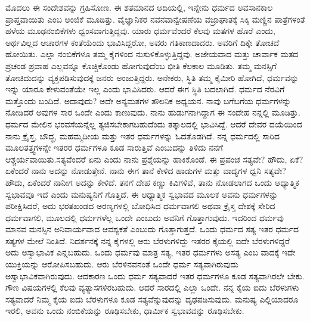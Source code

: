 ಮೊದಲು ಈ ಸಂದೇಶವನ್ನು ಗ್ರಹಿಸೋಣ. ಈ ಶತಮಾನದ ಆದಿಯಲ್ಲಿ, ಇನ್ನೇನು ಧರ್ಮದ ಅವಸಾನಕಾಲ ಪ್ರಾಪ್ತವಾಯಿತು ಎಂಬ ಅಂಜಿಕೆ ಮೂಡಿತ್ತು. ವೈಜ್ಞಾನಿಕರ ನವನವಾನ್ವೇಷಣೆಯ ವಜ್ರಾಘಾತಕ್ಕೆ ಸಿಕ್ಕಿ ಮಣ್ಣಿನ ಪಾತ್ರೆಗಳಂತೆ ಹಳೆಯ ಮೂಢನಂಬಿಕೆಗಳು ಧ್ವಂಸವಾಗುತ್ತಿದ್ದವು. ಯಾರು ಧರ್ಮವೆಂದರೆ ಕೆಲವು ಮತಗಳ ಹೊರೆ ಎಂದು, ಅರ್ಥವಿಲ್ಲದ ಆಚಾರಗಳ ಕಂತೆಯೆಂದು ಭಾವಿಸಿದ್ದರೋ, ಅವರು ಗತಿಕಾಣದಾದರು. ಅವರಿಗೆ ದಿಕ್ಕೇ ತೋಚದೆ ಹೋಯಿತು. ಎಲ್ಲಾ ನಂಬಿಕೆಗಳೂ ತಮ್ಮ ಕೈಗಳಿಂದ ನುಸುಳಿಕೊಳ್ಳುತ್ತಿದ್ದವು. ಅಜೇಯವಾದ ಮತ್ತು ಚಾರ್ವಾಕ ಮತದ ಪ್ರಚಂಡ ಪ್ರವಾಹ ಎಲ್ಲವನ್ನೂ ಕೊಚ್ಚಿಕೊಂಡು ಹೋಗುವುದೆಂಬ ಭೀತಿ ಕೆಲಕಾಲ ಮೂಡಿತು. ತಮ್ಮ ಮನಸ್ಸಿಗೆ ತೋಚಿದುದನ್ನು ವ್ಯಕ್ತಪಡಿಸುವುದಕ್ಕೆ ಜನರು ಅಂಜುತ್ತಿದ್ದರು. ಅನೇಕರು, ಸ್ಥಿತಿ ತಮ್ಮ ಕೈಮೀರಿ ಹೋಗಿದೆ, ಧರ್ಮವನ್ನು ಇನ್ನು ಯಾರೂ ಕೇಳುವಂತೆಯೇ ಇಲ್ಲ ಎಂದು ಭಾವಿಸಿದರು. ಆದರೆ ಈಗ ಸ್ಥಿತಿ ಬದಲಾಗಿದೆ. ಧರ್ಮದ ನೆರವಿಗೆ ಮತ್ತೊಂದು ಬಂದಿದೆ. ಅದಾವುದು? ಅದೇ ಅನ್ಯಮತಗಳ ತೌಲನಿಕ ಅಧ್ಯಯನ. ನಾವು ಬಗೆಬಗೆಯ ಧರ್ಮಗಳನ್ನು ನೋಡಿದರೆ ಅವುಗಳ ಸಾರ ಒಂದೇ ಎಂದು ಕಾಣುವುದು. ನಾನು ಹುಡುಗನಾಗಿದ್ದಾಗ ಈ ಸಂದೇಹ ನನ್ನಲ್ಲಿ ಮೂಡಿತ್ತು. ಧರ್ಮದ ಮೇಲಿನ ಭರವಸೆಯನ್ನೆಲ್ಲ ತ್ಯಜಿಸಬೇಕಾಗಬಹುದೆಂದು ತತ್ಕಾಲದಲ್ಲಿ ಭಾವಿಸಿದ್ದೆ. ಆದರೆ ದೇವರ ದಯೆಯಿಂದ ನಾನು ಕ್ರೈಸ್ತ, ಬೌದ್ಧ, ಮಹಮ್ಮದೀಯ ಮತ್ತು ಇತರ ಧರ್ಮಗಳನ್ನು ಓದತೊಡಗಿದೆ. ನನ್ನ ಧರ್ಮದಲ್ಲಿ ಸಾರಿದ ಮೂಲತತ್ತ್ವಗಳನ್ನೇ ಇತರರ ಧರ್ಮಗಳೂ ಕೂಡ ಸಾರುತ್ತಿವೆ ಎಂಬುದನ್ನು ತಿಳಿದು ನನಗೆ ಆಶ್ಚರ್ಯವಾಯಿತು.\break ಸತ್ಯವೆಂದರೆ ಏನು ಎಂದು ನಾನು ಪ್ರಶ್ನೆಯನ್ನು ಹಾಕಿಕೊಂಡೆ. ಈ ಪ್ರಪಂಚ ಸತ್ಯವೇ? ಹೌದು, ಏಕೆ? ಏಕೆಂದರೆ ನಾನು ಅದನ್ನು ನೋಡುತ್ತೇನೆ. ನಾನು ಈಗ ತಾನೆ ಕೇಳಿದ ಹಾಡುಗಳ ಮತ್ತು ವಾದ್ಯಗಳ ಧ್ವನಿ ಸತ್ಯವೇ? ಹೌದು, ಏಕೆಂದರೆ ನಾನೀಗ ಅದನ್ನು ಕೇಳಿದೆ. ತನಗೆ ದೇಹ ಕಣ್ಣು ಕಿವಿಗಳಿವೆ, ತಾನು ನೋಡಲಾಗದ ಒಂದು ಆಧ್ಯಾತ್ಮಿಕ ಸ್ವಭಾವವೂ ಇದೆ ಎಂದು ಮನುಷ್ಯನಿಗೆ ಗೊತ್ತಿದೆ. ಈ ಆಧ್ಯಾತ್ಮಿಕ ಸ್ವಭಾವದ ಮೂಲಕ ಅವನು ಧರ್ಮಗಳನ್ನು ಪರೀಕ್ಷಿಸಿದರೆ, ಅದು ಭರತಖಂಡದ ಅರಣ್ಯಗಳಲ್ಲಿ ಬೋಧಿಸಿದ ಧರ್ಮವಾಗಲಿ ಅಥವಾ ಕ್ರೈಸ್ತ ದೇಶಕ್ಕೆ ಸೇರಿದ ಧರ್ಮವಾಗಲಿ, ಮೂಲದಲ್ಲಿ ಧರ್ಮಗಳೆಲ್ಲ ಒಂದೇ ಎಂಬುದು ಅವನಿಗೆ ಗೊತ್ತಾಗುವುದು. ಇದರಿಂದ ಧರ್ಮವು ಮಾನವ ಮನಸ್ಸಿನ ಅನಿವಾರ್ಯವಾದ ಆವಶ್ಯಕತೆ ಎಂಬುದು ಗೊತ್ತಾಗುತ್ತದೆ. ಒಂದು ಧರ್ಮದ ಸತ್ಯ ಇತರ ಧರ್ಮದ ಸತ್ಯಗಳ ಮೇಲೆ ನಿಂತಿದೆ. ನಿದರ್ಶನಕ್ಕೆ ನನ್ನ ಕೈಗಳಲ್ಲಿ ಆರು ಬೆರಳುಗಳಿದ್ದು ಇತರರ ಕೈಯಲ್ಲಿ ಐದೇ ಬೆರಳುಗಳಿದ್ದರೆ ಅದು ಅಸ್ವಾಭಾವಿಕ ಎನ್ನಬಹುದು. ಒಂದು ಧರ್ಮವು ಮಾತ್ರ ಸತ್ಯ, ಇತರ ಧರ್ಮಗಳು ಅಸತ್ಯ ಎಂಬ ವಾದಕ್ಕೆ ಇದೇ ಯುಕ್ತಿಯನ್ನು ಆರೋಪಿಸಬಹುದು. ಆರು ಬೆರಳಿನವನಂತೆ ಒಂದೇ ಧರ್ಮ ಸತ್ಯವಾಗಿರುವುದು ಅಸ್ವಾಭಾವಿಕವಾಗಿರುವುದು. ಆದಕಾರಣ ಒಂದು ಧರ್ಮ ಸತ್ಯವಾದರೆ ಇತರ ಧರ್ಮಗಳೂ ಕೂಡ ಸತ್ಯವಾಗಿರಲೇ ಬೇಕು. ಗೌಣ ವಿಷಯಗಳಲ್ಲಿ ಕೆಲವು ವ್ಯತ್ಯಾಸಗಳಿರಬಹುದು. ಆದರೆ ಸಾರದಲ್ಲಿ ಎಲ್ಲಾ ಒಂದೇ. ನನ್ನ ಕೈಯ ಐದು ಬೆರಳುಗಳು ಸತ್ಯವಾದರೆ ನಿಮ್ಮ ಕೈಯ ಐದು ಬೆರಳುಗಳೂ ಕೂಡ ಸತ್ಯವೆನ್ನುವುದನ್ನು ದೃಢಪಡಿಸುವುದು. ಮನುಷ್ಯ ಎಲ್ಲಿಯಾದರೂ ಇರಲಿ, ಅವನು ಒಂದು ನಂಬಿಕೆಯನ್ನು ರೂಢಿಸಬೇಕು, ಧಾರ್ಮಿಕ ಸ್ವಭಾವವನ್ನು ರೂಢಿಸಬೇಕು.

